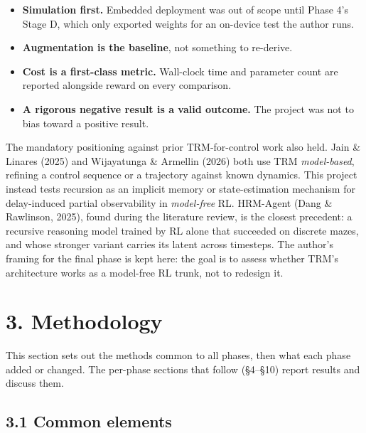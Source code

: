 \documentclass[11pt]{article}
\begin{document}
\begin{itemize}
\item \textbf{Simulation first.} Embedded deployment was out of scope until Phase 4's Stage D, which only exported weights for an on-device test the author runs.
\item \textbf{Augmentation is the baseline}, not something to re-derive.
\item \textbf{Cost is a first-class metric.} Wall-clock time and parameter count are reported alongside reward on every comparison.
\item \textbf{A rigorous negative result is a valid outcome.} The project was not to bias toward a positive result.
\end{itemize}



The mandatory positioning against prior TRM-for-control work also held. Jain \& Linares (2025) and Wijayatunga \& Armellin (2026) both use TRM \emph{model-based}, refining a control sequence or a trajectory against known dynamics. This project instead tests recursion as an implicit memory or state-estimation mechanism for delay-induced partial observability in \emph{model-free} RL. HRM-Agent (Dang \& Rawlinson, 2025), found during the literature review, is the closest precedent: a recursive reasoning model trained by RL alone that succeeded on discrete mazes, and whose stronger variant carries its latent across timesteps. The author's framing for the final phase is kept here: the goal is to assess whether TRM's architecture works as a model-free RL trunk, not to redesign it.



\medskip



\section*{3. Methodology}



This section sets out the methods common to all phases, then what each phase added or changed. The per-phase sections that follow (\S{}4--\S{}10) report results and discuss them.



\subsection*{3.1 Common elements}
\end{document}
